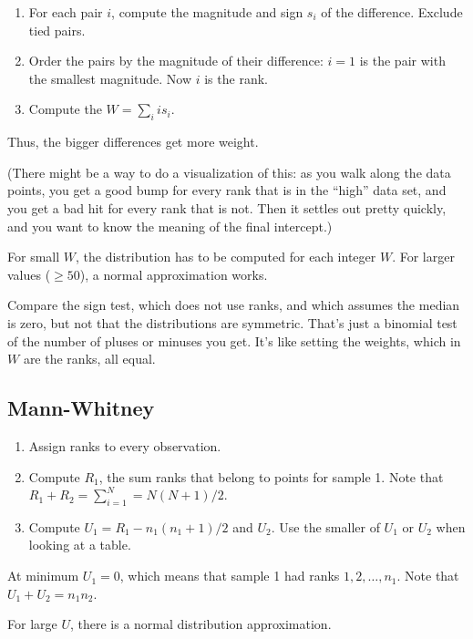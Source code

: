 \begin{enumerate}
\def\labelenumi{\arabic{enumi}.}
\tightlist
\item
  For each pair \(i\), compute the magnitude and sign \(s_i\) of the
  difference. Exclude tied pairs.
\item
  Order the pairs by the magnitude of their difference: \(i=1\) is the
  pair with the smallest magnitude. Now \(i\) is the rank.
\item
  Compute the \(W = \sum_i i s_i\).
\end{enumerate}

Thus, the bigger differences get more weight.

(There might be a way to do a visualization of this: as you walk along
the data points, you get a good bump for every rank that is in the
``high'' data set, and you get a bad hit for every rank that is not.
Then it settles out pretty quickly, and you want to know the meaning of
the final intercept.)

For small \(W\), the distribution has to be computed for each integer
\(W\). For larger values (\(\geq 50\)), a normal approximation works.

Compare the sign test, which does not use ranks, and which assumes the
median is zero, but not that the distributions are symmetric. That's
just a binomial test of the number of pluses or minuses you get. It's
like setting the weights, which in \(W\) are the ranks, all equal.

\subsection{Mann-Whitney}\label{mann-whitney}

\begin{enumerate}
\def\labelenumi{\arabic{enumi}.}
\tightlist
\item
  Assign ranks to every observation.
\item
  Compute \(R_1\), the sum ranks that belong to points for sample 1.
  Note that \(R_1 + R_2 = \sum_{i=1}^N = N(N+1)/2\).
\item
  Compute \(U_1 = R_1 - n_1(n_1+1)/2\) and \(U_2\). Use the smaller of
  \(U_1\) or \(U_2\) when looking at a table.
\end{enumerate}

At minimum \(U_1 = 0\), which means that sample 1 had ranks
\(1,2,\ldots,n_1\). Note that \(U_1 + U_2 = n_1 n_2\).

For large \(U\), there is a normal distribution approximation.

